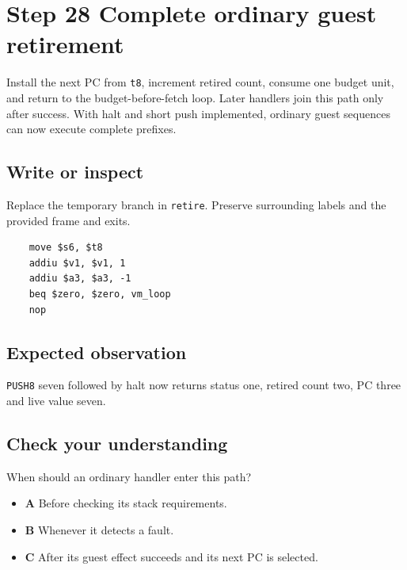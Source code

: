 \section{Step 28 Complete ordinary guest retirement}\label{vm-s28}

Install the next PC from \texttt{t8}, increment retired count, consume one budget unit, and return to the budget-before-fetch loop. Later handlers join this path only after success. With halt and short push implemented, ordinary guest sequences can now execute complete prefixes.

\subsection{Write or inspect}
Replace the temporary branch in \texttt{retire}. Preserve surrounding labels and the provided frame and exits.

\begin{verbatim}
    move $s6, $t8
    addiu $v1, $v1, 1
    addiu $a3, $a3, -1
    beq $zero, $zero, vm_loop
    nop
\end{verbatim}
\subsection{Expected observation}
\texttt{PUSH8} seven followed by halt now returns status one, retired count two, PC three and live value seven.

\subsection{Check your understanding}
When should an ordinary handler enter this path?

\begin{itemize}
  \item \textbf{A} Before checking its stack requirements.
  \item \textbf{B} Whenever it detects a fault.
  \item \textbf{C} After its guest effect succeeds and its next PC is selected.
\end{itemize}
